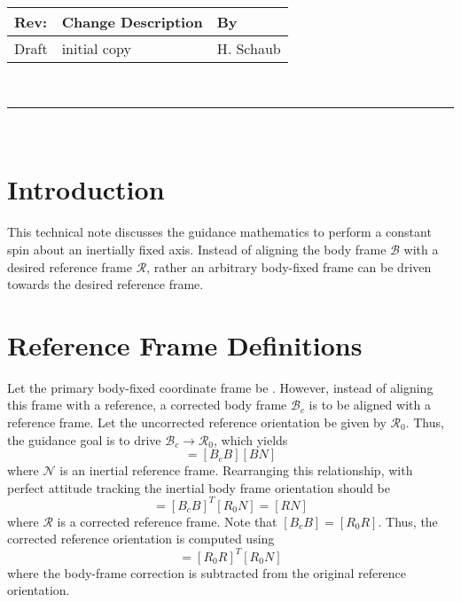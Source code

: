 \documentclass[]{AVSSimReportMemo}
\begin{document}
\makeCover


%
%
\pagestyle{empty}
{\renewcommand{\arraystretch}{2}
\noindent
\begin{longtable}{|p{0.5in}|p{4.5in}|p{1.14in}|}
\hline
{\bfseries Rev}: & {\bfseries Change Description} & {\bfseries By} \\
\hline
Draft & initial copy & H. Schaub \\
\hline

\end{longtable}
}

\newpage
\setcounter{page}{1}
\pagestyle{fancy}

\tableofcontents
~\\ \hrule ~\\


\section{Introduction}
This technical note discusses the guidance mathematics to perform a constant spin about an inertially fixed axis.  Instead of aligning the body frame $\mathcal{B}$ with a desired reference frame $\mathcal{R}$, rather an arbitrary body-fixed frame can be driven towards the desired reference frame.  


\section{Reference Frame Definitions}
Let the primary body-fixed coordinate frame be . However, instead of aligning this frame with a reference, a corrected body frame $\mathcal{B}_{c}$ is to be aligned with a reference frame.   Let the uncorrected reference orientation be given by $\mathcal{R}_{0}$.  Thus, the guidance goal is to drive $\mathcal{B}_{c} \rightarrow \mathcal{R}_{0}$, which yields
\begin{equation}
	[R_{0} N] = [B_{c} B] [BN]
\end{equation}
where $\mathcal{N}$ is an inertial reference frame.  Rearranging this relationship, with perfect attitude tracking the inertial body frame orientation should be
\begin{equation}
	 [BN] = [B_{c} B]^{T} [R_{0}N]  = [RN]
\end{equation}
where $\mathcal{R}$ is a corrected reference frame.  Note that $[B_{c} B] = [R_{0}R]$.  Thus, the corrected reference orientation is computed using
\begin{equation}
	 [RN] = [R_{0} R]^{T} [R_{0}N] 
\end{equation}
where the body-frame correction is subtracted from the original reference orientation.  
\end{document}
